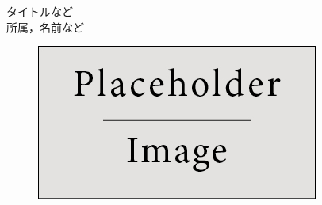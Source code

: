 
\begin{minipage}[]{0.88\columnwidth}
  \Huge タイトルなど  \\[10mm]
  \Large 所属，名前など \\
\end{minipage}
\begin{minipage}[]{0.11\columnwidth}
  \begin{figure}\centering
    \includegraphics[width=\columnwidth]{placeholder.jpg}
  \end{figure}
\end{minipage}
